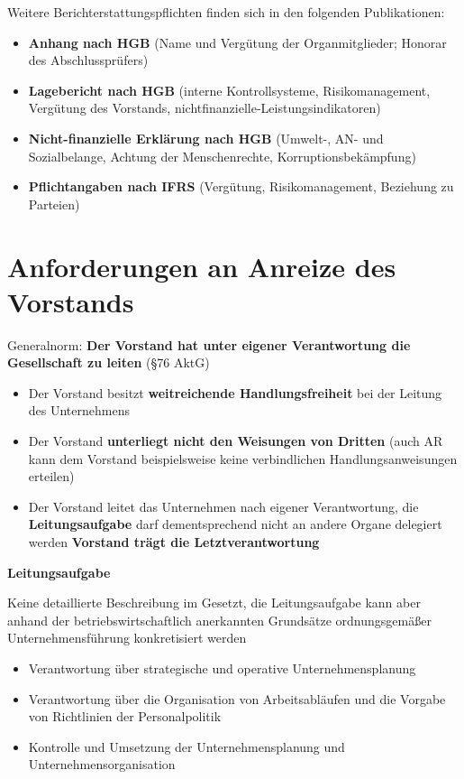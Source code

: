\documentclass[
]{article}
\providecommand{\tightlist}{%
  \setlength{\itemsep}{0pt}\setlength{\parskip}{0pt}}
\begin{document}
Weitere Berichterstattungspflichten finden sich in den folgenden
Publikationen:

\begin{itemize}
\tightlist
\item
  \textbf{Anhang nach HGB} (Name und Vergütung der Organmitglieder;
  Honorar des Abschlussprüfers)
\item
  \textbf{Lagebericht nach HGB} (interne Kontrollsysteme,
  Risikomanagement, Vergütung des Vorstands,
  nichtfinanzielle-Leistungsindikatoren)
\item
  \textbf{Nicht-finanzielle Erklärung nach HGB} (Umwelt-, AN- und
  Sozialbelange, Achtung der Menschenrechte, Korruptionsbekämpfung)
\item
  \textbf{Pflichtangaben nach IFRS }(Vergütung, Risikomanagement,
  Beziehung zu Parteien)
\end{itemize}

\hypertarget{anforderungen-an-anreize-des-vorstands}{%
\section{Anforderungen an Anreize des
Vorstands}\label{anforderungen-an-anreize-des-vorstands}}

Generalnorm: \textbf{Der Vorstand hat unter eigener Verantwortung die
Gesellschaft zu leiten} (§76 AktG)

\begin{itemize}
\tightlist
\item
  Der Vorstand besitzt \textbf{weitreichende Handlungsfreiheit} bei der
  Leitung des Unternehmens
\item
  Der Vorstand \textbf{unterliegt nicht den Weisungen von Dritten} (auch
  AR kann dem Vorstand beispielsweise keine verbindlichen
  Handlungsanweisungen erteilen)
\item
  Der Vorstand leitet das Unternehmen nach eigener Verantwortung, die
  \textbf{Leitungsaufgabe} darf dementsprechend nicht an andere Organe
  delegiert werden \textbf{Vorstand trägt die Letztverantwortung}
\end{itemize}

\textbf{Leitungsaufgabe}

Keine detaillierte Beschreibung im Gesetzt, die Leitungsaufgabe kann
aber anhand der betriebswirtschaftlich anerkannten Grundsätze
ordnungsgemäßer Unternehmensführung konkretisiert werden

\begin{itemize}
\tightlist
\item
  Verantwortung über strategische und operative Unternehmensplanung
\item
  Verantwortung über die Organisation von Arbeitsabläufen und die
  Vorgabe von Richtlinien der Personalpolitik
\item
  Kontrolle und Umsetzung der Unternehmensplanung und
  Unternehmensorganisation
\end{itemize}
\end{document}
